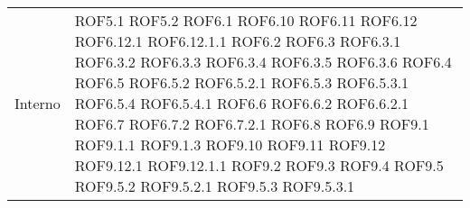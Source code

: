 \begin{longtable}{p{2.5cm}!{\VRule[1pt]}p{2.5cm}}
	Interno & ROF5.1 \newline ROF5.2 \newline ROF6.1 \newline ROF6.10 \newline ROF6.11 \newline ROF6.12 \newline ROF6.12.1 \newline ROF6.12.1.1 \newline ROF6.2 \newline ROF6.3 \newline ROF6.3.1 \newline ROF6.3.2 \newline ROF6.3.3 \newline ROF6.3.4 \newline ROF6.3.5 \newline ROF6.3.6 \newline ROF6.4 \newline ROF6.5 \newline ROF6.5.2 \newline ROF6.5.2.1 \newline ROF6.5.3 \newline ROF6.5.3.1 \newline ROF6.5.4 \newline ROF6.5.4.1 \newline ROF6.6 \newline ROF6.6.2 \newline ROF6.6.2.1 \newline ROF6.7 \newline ROF6.7.2 \newline ROF6.7.2.1 \newline ROF6.8 \newline ROF6.9 \newline ROF9.1 \newline ROF9.1.1 \newline ROF9.1.3 \newline ROF9.10 \newline ROF9.11 \newline ROF9.12 \newline ROF9.12.1 \newline ROF9.12.1.1 \newline ROF9.2 \newline ROF9.3 \newline ROF9.4 \newline ROF9.5 \newline ROF9.5.2 \newline ROF9.5.2.1 \newline ROF9.5.3 \newline ROF9.5.3.1 \\

\end{longtable}
